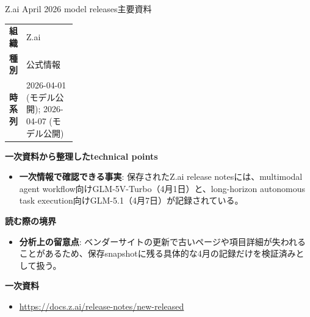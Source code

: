 \begin{technicalnote}{Z.ai April 2026 model releases}{主要資料}
\begingroup
\begin{tabularx}{\linewidth}{@{}>{\bfseries}p{0.22\linewidth}X@{}}
組織 & Z.ai \\
種別 & 公式情報 \\
時系列 & 2026-04-01 (モデル公開); 2026-04-07 (モデル公開) \\
\end{tabularx}
\smallskip
{\bfseries 一次資料から整理したtechnical points}
\begin{itemize}[leftmargin=1.5em,itemsep=0.35em]
\item \textbf{一次情報で確認できる事実}: 保存されたZ.ai release notesには、multimodal agent workflow向けGLM-5V-Turbo（4月1日）と、long-horizon autonomous task execution向けGLM-5.1（4月7日）が記録されている。
\end{itemize}
{\bfseries 読む際の境界}
\begin{itemize}[leftmargin=1.5em,itemsep=0.35em]
\item \textbf{分析上の留意点}: ベンダーサイトの更新で古いページや項目詳細が失われることがあるため、保存snapshotに残る具体的な4月の記録だけを検証済みとして扱う。
\end{itemize}
\begin{samepage}
{\bfseries 一次資料}
\begingroup\sloppy
\begin{itemize}[leftmargin=1.5em,itemsep=0.25em]
\item {\scriptsize\url{https://docs.z.ai/release-notes/new-released}}
\end{itemize}
\endgroup
\end{samepage}
\endgroup
\end{technicalnote}
\medskip

